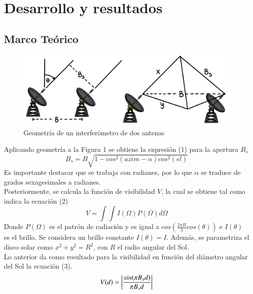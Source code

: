 \section{Desarrollo y resultados}
\subsection{Marco Teórico}
\begin{figure}[H]
\centering
\includegraphics[scale=0.4]{img/img/imagen1.png}
\caption{\label{fig:Grafico} Geometría de un interferómetro de dos antenas}
\end{figure}
Aplicando geometría a la Figura 1 se obtiene la expresión (1) para la apertura $B_s$
\begin{equation}
    B_s=B\sqrt{1-cos^2(azim-\alpha)cos^2(el)}
\end{equation}
Es importante destacar que se trabaja con radianes, por lo que $\alpha$ se traduce de grados sexagesimales a radianes.\\
Posteriormente, se calcula la función de visibilidad $V$, la cual se obtiene tal como indica la ecuación (2)
\begin{equation}
    V=\int\int I(\Omega)P(\Omega)d\Omega
\end{equation}
Donde $P(\Omega)$ es el patrón de radiación y es igual a $cos\left(\frac{2\pi B}{\lambda}cos(\theta)\right)$ e $I(\theta)$ es el brillo. Se considera un brillo constante $I(\theta)=I$. Además, se parametriza el disco solar como $x^2+y^2=R^2$, con $R$ el radio angular del Sol.\\
Lo anterior da como resultado para la visibilidad en función del diámetro angular del Sol la ecuación (3).
\begin{equation}
    V(d)=\abs{\frac{sin(\pi B_s d)}{\pi B_s d}}
\end{equation}
